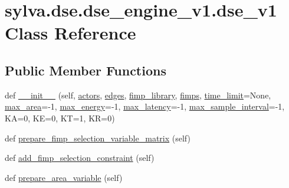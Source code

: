 \hypertarget{classsylva_1_1dse_1_1dse__engine__v1_1_1dse__v1}{}\section{sylva.\+dse.\+dse\+\_\+engine\+\_\+v1.\+dse\+\_\+v1 Class Reference}
\label{classsylva_1_1dse_1_1dse__engine__v1_1_1dse__v1}
\subsection*{Public Member Functions}
\begin{DoxyCompactItemize}
\item 
def \hyperlink{classsylva_1_1dse_1_1dse__engine__v1_1_1dse__v1_a918479438f80d4a9fa13f473cf8410c5}{\+\_\+\+\_\+init\+\_\+\+\_\+} (self, \hyperlink{classsylva_1_1dse_1_1dse__engine__v1_1_1dse__v1_a9f0aaeefa528b0ae754ebce69fc2375a}{actors}, \hyperlink{classsylva_1_1dse_1_1dse__engine__v1_1_1dse__v1_a0b5b8b822b9f2c0857d863d5276d1414}{edges}, \hyperlink{classsylva_1_1dse_1_1dse__engine__v1_1_1dse__v1_ab451dd1ea77ef019a6413ab93f3ee766}{fimp\+\_\+library}, \hyperlink{classsylva_1_1dse_1_1dse__engine__v1_1_1dse__v1_a737ef1a913b4f4911e847240fd2c4bdc}{fimps}, \hyperlink{classsylva_1_1dse_1_1dse__engine__v1_1_1dse__v1_a8c776f086963df1ce7224d67075ba86e}{time\+\_\+limit}=None, \hyperlink{classsylva_1_1dse_1_1dse__engine__v1_1_1dse__v1_a7ccaf97aee0eea5ee5b815cc15c9ca8c}{max\+\_\+area}=-\/1, \hyperlink{classsylva_1_1dse_1_1dse__engine__v1_1_1dse__v1_aeb393a5a395f63412042d4cbeb299148}{max\+\_\+energy}=-\/1, \hyperlink{classsylva_1_1dse_1_1dse__engine__v1_1_1dse__v1_aff2dc8fd64544ea6cb34f13ea949db60}{max\+\_\+latency}=-\/1, \hyperlink{classsylva_1_1dse_1_1dse__engine__v1_1_1dse__v1_a4ad1aafd9ec5d08061e190467de2d0ca}{max\+\_\+sample\+\_\+interval}=-\/1, KA=0, KE=0, KT=1, KR=0)
\item 
def \hyperlink{classsylva_1_1dse_1_1dse__engine__v1_1_1dse__v1_a57ad8055ab8f06faaea0ecd6e219505b}{prepare\+\_\+fimp\+\_\+selection\+\_\+variable\+\_\+matrix} (self)
\item 
def \hyperlink{classsylva_1_1dse_1_1dse__engine__v1_1_1dse__v1_a240db3c706f81867165183e826760d5f}{add\+\_\+fimp\+\_\+selection\+\_\+constraint} (self)
\item 
def \hyperlink{classsylva_1_1dse_1_1dse__engine__v1_1_1dse__v1_ae6821709a81198eb510ee236808dd1ba}{prepare\+\_\+area\+\_\+variable} (self)
\item 

\end{DoxyCompactItemize}
